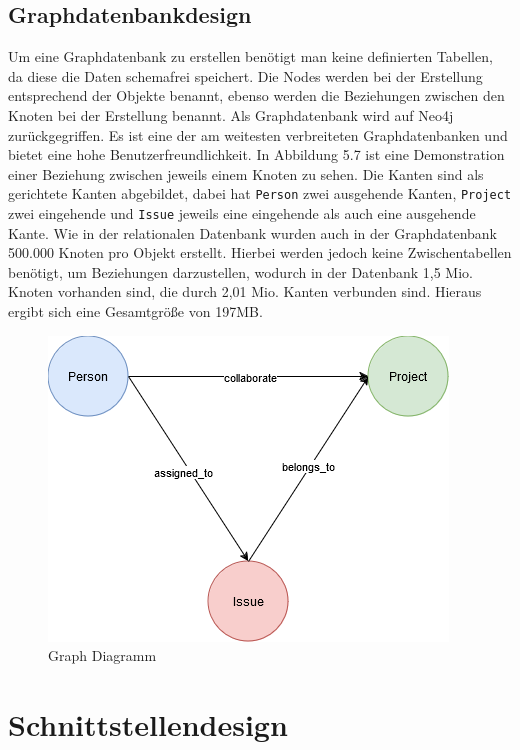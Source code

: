 \subsection{Graphdatenbankdesign} %
\label{sec:graphsdatenbankdesign}
Um eine Graphdatenbank zu erstellen benötigt man keine definierten Tabellen, da diese die Daten schemafrei speichert. Die Nodes werden bei der Erstellung entsprechend der Objekte benannt, ebenso werden die Beziehungen zwischen den Knoten bei der Erstellung benannt. Als Graphdatenbank wird auf Neo4j zurückgegriffen. Es ist eine der am weitesten verbreiteten Graphdatenbanken und bietet eine hohe Benutzerfreundlichkeit. In Abbildung 5.7 ist eine Demonstration einer Beziehung zwischen jeweils einem Knoten zu sehen. Die Kanten sind als gerichtete Kanten abgebildet, dabei hat \texttt{Person} zwei ausgehende Kanten, \texttt{Project} zwei eingehende und \texttt{Issue} jeweils eine eingehende als auch eine ausgehende Kante. Wie in der relationalen Datenbank wurden auch in der Graphdatenbank 500.000 Knoten pro Objekt erstellt. Hierbei werden jedoch keine Zwischentabellen benötigt, um Beziehungen darzustellen, wodurch in der Datenbank 1,5 Mio. Knoten vorhanden sind, die durch 2,01 Mio. Kanten verbunden sind. Hieraus ergibt sich eine Gesamtgröße von 197MB.


\begin{figure}[H]
	\centering
	\includegraphics[scale=.8]{Illustrations/graph_diagram}
	\caption{Graph Diagramm}
\end{figure}

\newpage
\section{Schnittstellendesign} %
\label{sec:schnittstellendesign}

